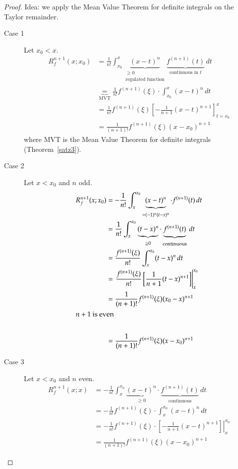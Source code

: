 \documentclass{article}
\begin{document}
\begin{proof}
  Idea: we apply the Mean Value Theorem for definite integrals on the Taylor remainder.

  \begin{description}
    \item[Case 1] Let $x_0 < x$.
      \begin{align*}
        R_f^{n+1}(x; x_0)
          &= \frac{1}{n!} \int_{x_0}^x \underbrace{(x - t)^n}_{\substack{\geq 0 \\ \text{regulated function}}} \underbrace{f^{(n+1)}(t)}_{\text{continuous in } t} \, dt \\
          &\underbrace{=}_{\text{MVT}} \frac{1}{n!} f^{(n+1)}(\xi) \cdot \int_{x_0}^x (x - t)^n \, dt \\
          &= \frac{1}{n!} f^{(n+1)} (\xi) \left[- \frac{1}{n+1} (x - t)^{n+1}\right]_{t = x_0}^x \\
          &= \frac{1}{(n+1)!} f^{(n+1)}(\xi)(x - x_0)^{n+1}
      \end{align*}
      where MVT is the Mean Value Theorem for definite integrals (Theorem~\ref{satz3}).
    \item[Case 2] Let $x < x_0$ and $n$ odd.
      \begin{align*}
        R_f^{n+1}(x; x_0) &= -\frac{1}{n!} \int_{x}^{x_0} \underbrace{(x - t)^n}_{= (-1)^n (t - x)^n} \cdot f^{(n+1)}(t) \, dt \\
          &= \frac{1}{n!} \int_x^{x_0} \underbrace{(t - x)^n}_{\geq 0} \cdot \underbrace{f^{(n+1)}(t)}_{\text{continuous}} \, dt \\
          &= \frac{f^{(n+1)}(\xi)}{n!} \int_x^{x_0} (t - x)^n \, dt \\
          &= \left.\frac{f^{(n+1)}(\xi)}{n!} \left[\frac{1}{n+1} (t - x)^{n+1}\right]\right|_{x}^{x_0} \\
          &= \frac{1}{(n+1)!} f^{(n+1)}(\xi)(x_0 - x)^{n+1} \\
        \intertext{$n+1$ is even} \\
          &= \frac{1}{(n+1)!} f^{(n+1)}(\xi)(x - x_0)^{n+1}
      \end{align*}
    \item[Case 3] Let $x < x_0$ and $n$ even.
      \begin{align*}
        R_f^{n+1}(x; x)
          &= -\frac{1}{n!} \int_x^{x_0} \underbrace{(x - t)^n}_{\geq 0} \cdot \underbrace{f^{(n+1)}(t)}_{\text{continuous}} \, dt \\
          &= -\frac1{n!} f^{(n+1)}(\xi) \cdot \int_x^{x_0} (x - t)^n \, dt \\
          &= \left. -\frac1{n!} f^{(n+1)}(\xi) \cdot \left[-\frac{1}{n+1} (x - t)^{n+1}\right]\right|_x^{x_0} \\
          &= \frac{1}{(n+1)!} f^{(n+1)}(\xi) (x - x_0)^{n+1}
      \end{align*}
  \end{description}
\end{proof}
\end{document}

